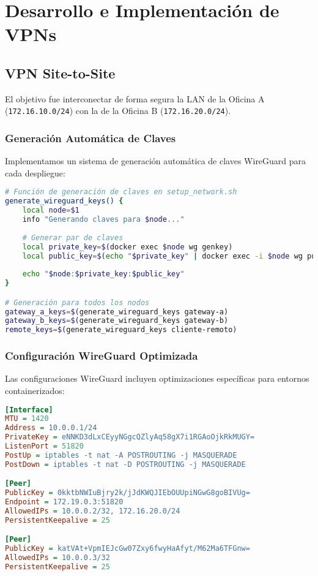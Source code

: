 \section{Desarrollo e Implementación de VPNs}

\subsection{VPN Site-to-Site}

El objetivo fue interconectar de forma segura la LAN de la Oficina A (\texttt{172.16.10.0/24}) con la de la Oficina B (\texttt{172.16.20.0/24}).

\subsubsection{Generación Automática de Claves}

Implementamos un sistema de generación automática de claves WireGuard para cada despliegue:

\begin{lstlisting}[language=bash, caption=Generación automática de claves WireGuard]
# Función de generación de claves en setup_network.sh
generate_wireguard_keys() {
    local node=$1
    info "Generando claves para $node..."
    
    # Generar par de claves
    local private_key=$(docker exec $node wg genkey)
    local public_key=$(echo "$private_key" | docker exec -i $node wg pubkey)
    
    echo "$node:$private_key:$public_key"
}

# Generación para todos los nodos
gateway_a_keys=$(generate_wireguard_keys gateway-a)
gateway_b_keys=$(generate_wireguard_keys gateway-b)
remote_keys=$(generate_wireguard_keys cliente-remoto)
\end{lstlisting}

\subsubsection{Configuración WireGuard Optimizada}

Las configuraciones WireGuard incluyen optimizaciones específicas para entornos containerizados:

\begin{lstlisting}[language=ini, caption=Configuración Gateway-A]
[Interface]
MTU = 1420
Address = 10.0.0.1/24
PrivateKey = eNNKD3dLxCEyyNGgcQZlyAq58gX7i1RGAoOjkRkMUGY=
ListenPort = 51820
PostUp = iptables -t nat -A POSTROUTING -j MASQUERADE
PostDown = iptables -t nat -D POSTROUTING -j MASQUERADE

[Peer]
PublicKey = 0kktbNWIuBjry2k/jJdKWQJIEbOUUpiNGwG8goBIVUg=
Endpoint = 172.19.0.3:51820
AllowedIPs = 10.0.0.2/32, 172.16.20.0/24
PersistentKeepalive = 25

[Peer]
PublicKey = katVAt+VpmIEJcGw07Zxy6fwyHaAfyt/M62Ma6TFGnw=
AllowedIPs = 10.0.0.3/32
PersistentKeepalive = 25
\end{lstlisting}

